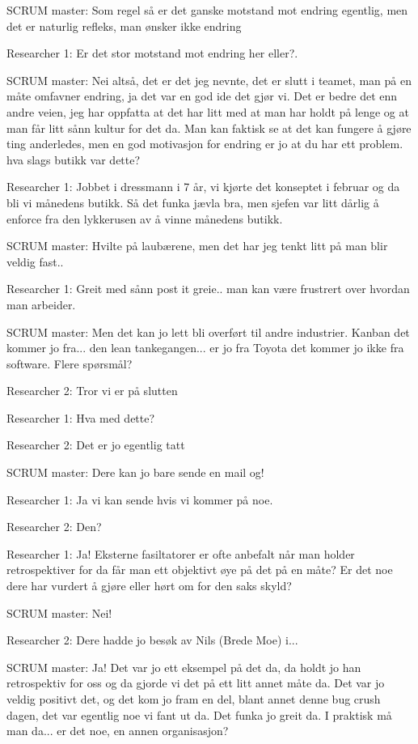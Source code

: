 SCRUM master: Som regel så er det ganske motstand mot endring egentlig, men det er naturlig refleks, man ønsker ikke endring 

Researcher 1: Er det stor motstand mot endring her eller?. 

SCRUM master: Nei altså, det er det jeg nevnte, det er slutt i teamet, man på en måte omfavner endring, ja det var en god ide det gjør vi. Det er bedre det enn andre veien, jeg har oppfatta at det har litt med at man har holdt på lenge og at man får litt sånn kultur for det da. Man kan faktisk se at det kan fungere å gjøre ting anderledes, men en god motivasjon for endring er jo at du har ett problem. hva slags butikk var dette?

Researcher 1: Jobbet i dressmann i 7 år, vi kjørte det konseptet i februar og da bli vi månedens butikk. Så det funka jævla bra, men sjefen var litt dårlig å enforce fra den lykkerusen av å vinne månedens butikk.

SCRUM master: Hvilte på laubærene, men det har jeg tenkt litt på man blir veldig fast..

Researcher 1: Greit med sånn post it greie.. man kan være frustrert over hvordan man arbeider.

SCRUM master: Men det kan jo lett bli overført til andre industrier. Kanban det kommer jo fra... den lean tankegangen... er jo fra Toyota det kommer jo ikke fra software. Flere spørsmål?

Researcher 2: Tror vi er på slutten

Researcher 1: Hva med dette?

Researcher 2: Det er jo egentlig tatt

SCRUM master: Dere kan jo bare sende en mail og!

Researcher 1: Ja vi kan sende hvis vi kommer på noe.

Researcher 2: Den?

Researcher 1: Ja! Eksterne fasiltatorer er ofte anbefalt når man holder retrospektiver for da får man ett objektivt øye på det på en måte? Er det noe dere har vurdert å gjøre eller hørt om for den saks skyld? 

SCRUM master: Nei!

Researcher 2: Dere hadde jo besøk av Nils (Brede Moe) i...

SCRUM master: Ja! Det var jo ett eksempel på det da, da holdt jo han retrospektiv for oss og da gjorde vi det på ett litt annet måte da. Det var jo veldig positivt det, og det kom jo fram en del, blant annet denne bug crush dagen, det var egentlig noe vi fant ut da. Det funka jo greit da. I praktisk må man da... er det noe, en annen organisasjon?

